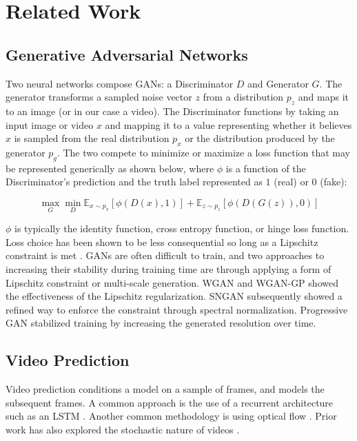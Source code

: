 \documentclass[tablecaption=bottom,pmlr]{jmlr}
\begin{document}
\section{Related Work}

\subsection{Generative Adversarial Networks}

Two neural networks compose GANs: a Discriminator $D$ and Generator $G$. The generator transforms a sampled noise vector $z$ from a distribution $p_z$ and maps it to an image (or in our case a video). The Discriminator functions by taking an input image or video $x$ and mapping it to a value representing whether it believes $x$ is sampled from the real distribution $p_x$ or the distribution produced by the generator $p_g$. The two compete to minimize or maximize a loss function that may be represented generically as shown below, where $\phi$ is a function of the Discriminator's prediction and the truth label represented as $1$ (real) or $0$ (fake):

$$
\max_G \min_D \mathbb{E}_{x\sim p_x}[\phi(D(x),1)] + \mathbb{E}_{z\sim p_z}[\phi(D(G(z)),0)]
$$

$\phi$ is typically the identity function, cross entropy function, or hinge loss function. Loss choice has been shown to be less consequential so long as a Lipschitz constraint is met \citep{lossfuncgan}. GANs are often difficult to train, and two approaches to increasing their stability during training time are through applying a form of Lipschitz constraint or multi-scale generation. WGAN \citep{wgan} and WGAN-GP \citep{wgangp} showed the effectiveness of the Lipschitz regularization. SNGAN \citep{sngan} subsequently showed a refined way to enforce the constraint through spectral normalization. Progressive GAN \citep{proggan} stabilized training by increasing the generated resolution over time.

\subsection{Video Prediction}

Video prediction conditions a model on a sample of frames, and models the subsequent frames. A common approach is the use of a recurrent architecture such as an LSTM \citep{vidrecurrent1,vidrecurrent2,vidrecurrent3,vidrecurrent4,vidrecurrent5,vidrecurrent6}. Another common methodology is using optical flow \citep{flow1,flow2,flow3,flow4}. Prior work has also explored the stochastic nature of videos \citep{stochasticgen,stochasticvar,savp,slatentres,stochhighfid}.
\end{document}
